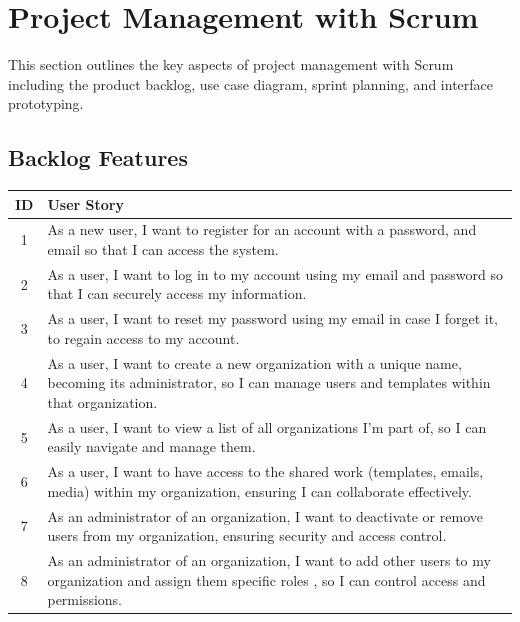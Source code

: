 \section{Project Management with Scrum}

This section outlines the key aspects of project management with Scrum including the product backlog, use case diagram, sprint planning, and interface prototyping.

\subsection{Backlog Features}
\begin{longtable}{|c|p{}|}
	\hline
	\textbf{ID} & \textbf{User Story}                                                                                                                                            \\
	\hline
	\endhead
	1           & As a new user, I want to register for an account with a password, and email so that I can access the system.                                                   \\
	\hline
	2           & As a user, I want to log in to my account using my email and password so that I can securely access my information.                                            \\
	\hline
	3           & As a user, I want to reset my password using my email in case I forget it, to regain access to my account.                                                     \\
	\hline
	4           & As a user, I want to create a new organization with a unique name, becoming its administrator, so I can manage users and templates within that organization.   \\
	\hline
	5           & As a user, I want to view a list of all organizations I'm part of, so I can easily navigate and manage them.                                                   \\
	\hline
	6           & As a user, I want to have access to the shared work (templates, emails, media) within my organization, ensuring I can collaborate effectively.                 \\
	\hline
	7           & As an administrator of an organization, I want to deactivate or remove users from my organization, ensuring security and access control.                       \\
	\hline
	8           & As an administrator of an organization, I want to add other users to my organization and assign them specific roles , so I can control access and permissions. \\

\end{longtable}
